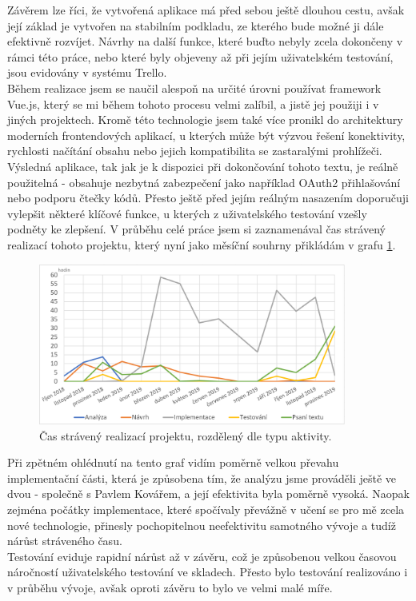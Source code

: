 \begin{conclusion} \label{conclusion}

Závěrem lze říci, že vytvořená aplikace má před sebou ještě dlouhou cestu, avšak její základ je vytvořen na stabilním podkladu, ze kterého bude možné ji dále efektivně rozvíjet. Návrhy na další funkce, které buďto nebyly zcela dokončeny v rámci této práce, nebo které byly objeveny až při jejím uživatelském testování, jsou evidovány v systému Trello.\\
Během realizace jsem se naučil alespoň na určité úrovni používat framework Vue.js, který se mi během tohoto procesu velmi zalíbil, a jistě jej použiji i v jiných projektech. Kromě této technologie jsem také více pronikl do architektury moderních frontendových aplikací, u kterých může být výzvou řešení konektivity, rychlosti načítání obsahu nebo jejich kompatibilita se zastaralými prohlížeči.\\
Výsledná aplikace, tak jak je k dispozici při dokončování tohoto textu, je reálně použitelná - obsahuje nezbytná zabezpečení jako například OAuth2 přihlašování nebo podporu čtečky kódů. Přesto ještě před jejím reálným nasazením doporučuji vylepšit některé klíčové funkce, u kterých z uživatelského testování vzešly podněty ke zlepšení.
V průběhu celé práce jsem si zaznamenával čas strávený realizací tohoto projektu, který nyní jako měsíční souhrny přikládám v grafu \ref{picture:time:spent}.

\begin{figure}[H]
\includegraphics[width=0.9\textwidth]{../png/time/time_spent.png}
\caption[Měsíční čas strávený realizací projektu]{Čas strávený realizací projektu, rozdělený dle typu aktivity.} \label{picture:time:spent}
\end{figure}

Při zpětném ohlédnutí na tento graf vidím poměrně velkou převahu implementační části, která je způsobena tím, že analýzu jsme prováděli ještě ve dvou - společně s Pavlem Kovářem, a její efektivita byla poměrně vysoká. Naopak zejména počátky implementace, které spočívaly převážně v učení se pro mě zcela nové technologie, přinesly pochopitelnou neefektivitu samotného vývoje a tudíž nárůst stráveného času.\\
Testování eviduje rapidní nárůst až v závěru, což je způsobenou velkou časovou náročností uživatelského testování ve skladech. Přesto bylo testování realizováno i v průběhu vývoje, avšak oproti závěru to bylo ve velmi malé míře.\\

\end{conclusion}
